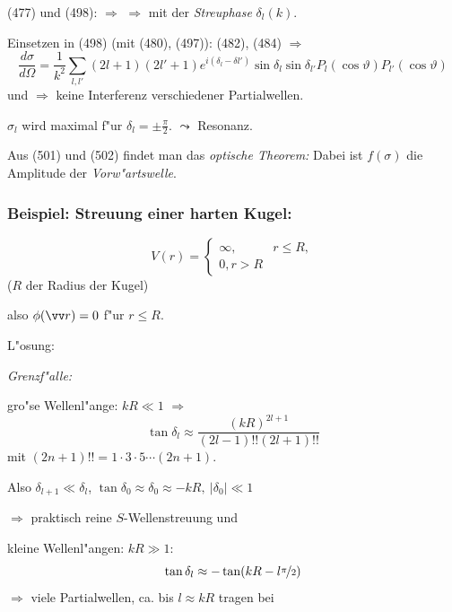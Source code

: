 \documentclass[a4paper]{scrartcl}
\begin{document}
(477) und (498):
$\Longrightarrow$
$\Longrightarrow$
mit der \emph{Streuphase} $\delta_l(k)$.

Einsetzen in (498) (mit (480), (497)):
(482), (484) $\Longrightarrow$
$$\frac{d \sigma}{d \Omega} = \frac1{k^2} \sum_{l,l'} (2l +1)(2l' +1) e^{i(\delta_l - \delta{l'})} \sin \delta_l \sin \delta_{l'} P_l (\cos \vartheta) P_{l'} (\cos \vartheta)$$
und 
$\Longrightarrow$ keine Interferenz verschiedener Partialwellen.

$\sigma_l$ wird maximal f"ur $\delta_l = \pm \frac \pi 2$. $\leadsto$ Resonanz.

Aus (501) und (502) findet man das \emph{optische Theorem:}
Dabei ist $f(\sigma)$ die Amplitude der \emph{Vorw"artswelle}.

\subsubsection*{Beispiel: Streuung einer harten Kugel:}
$$V(r) = \begin{cases} \infty, & r \leq R, \\ 0, r > R \end{cases}$$
($R$ der Radius der Kugel)

also $\phi(\vv r) = 0$ f"ur $r \leq R$.

L"osung: 

\emph{Grenzf"alle:}

\begin{1aufz}
\item gro"se Wellenl"ange: $kR \ll 1$ $\Longrightarrow$
$$\tan \delta_l \approx \frac{ (kR)^{2l +1}}{ (2l -1) !! (2l +1) !!}$$
mit $(2n +1)!! = 1 \cdot 3 \cdot 5 \cdots (2n+1)$.

Also $\delta_{l+1} \ll \delta_l$, $\tan \delta_0 \approx \delta_0 \approx -kR, \ \vert \delta_0 \vert \ll 1$

$\Longrightarrow$ praktisch reine $S$-Wellenstreuung und 
\item kleine Wellenl"angen: $kR \gg 1$:
$$\tan \delta_l \approx - \tan( kR- l \nicefrac \pi 2)$$
$\Longrightarrow$ viele Partialwellen, ca. bis $l \approx kR$ tragen bei
\end{1aufz}
\end{document}
